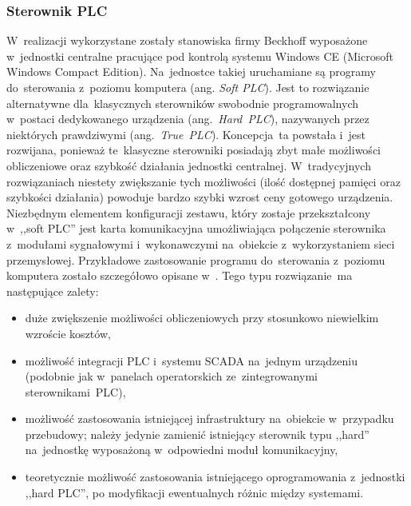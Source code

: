 \subsubsection{Sterownik PLC}
W~realizacji wykorzystane zostały stanowiska firmy Beckhoff wyposażone w~jednostki centralne pracujące pod kontrolą systemu Windows CE (Microsoft Windows Compact Edition). Na~jednostce takiej uruchamiane są programy do~sterowania z~poziomu komputera (ang. \textit{Soft PLC}). Jest to rozwiązanie alternatywne dla~klasycznych sterowników swobodnie programowalnych w~postaci dedykowanego urządzenia (ang.~\textit{Hard~PLC}), nazywanych przez niektórych prawdziwymi (ang.~\textit{True~PLC}).
Koncepcja~ta powstała i~jest rozwijana, ponieważ te~klasyczne sterowniki posiadają zbyt małe możliwości obliczeniowe oraz szybkość działania jednostki centralnej. W~tradycyjnych rozwiązaniach niestety zwiększanie tych możliwości (ilość dostępnej pamięci oraz szybkości działania) powoduje bardzo szybki wzrost ceny gotowego urządzenia.
Niezbędnym elementem konfiguracji zestawu, który zostaje przekształcony w~,,soft PLC'' jest karta komunikacyjna umożliwiająca połączenie sterownika z~modułami sygnałowymi i~wykonawczymi na~obiekcie z~wykorzystaniem sieci przemysłowej.
Przykładowe zastosowanie programu do~sterowania z~poziomu komputera zostało szczegółowo opisane w~\cite{art_softPLC}.
Tego typu rozwiązanie~ma następujące zalety:
\begin{itemize}
\item duże zwiększenie możliwości obliczeniowych przy stosunkowo niewielkim wzroście kosztów,
\item możliwość integracji PLC i~systemu SCADA na~jednym urządzeniu (podobnie jak w~panelach operatorskich ze~zintegrowanymi sterownikami~PLC),
\item możliwość zastosowania istniejącej infrastruktury na~obiekcie w~przypadku przebudowy; należy jedynie zamienić istniejący sterownik typu ,,hard'' na~jednostkę wyposażoną w~odpowiedni moduł komunikacyjny,
\item teoretycznie możliwość zastosowania istniejącego oprogramowania z~jednostki ,,hard PLC'', po modyfikacji ewentualnych różnic między systemami.
\end{itemize}


